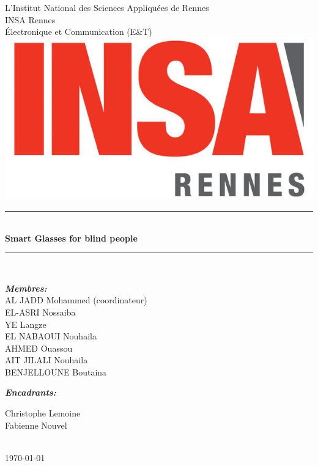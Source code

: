 \documentclass[12pt]{report}
\begin{document}

\begin{center}

\Huge{L’Institut National des Sciences Appliquées de Rennes}\\[.5cm]
\huge{INSA Rennes}\\[.5cm]

\Large
Électronique et Communication (E\&T)\\[1cm] 
\includegraphics[width=14cm, height=7cm]{4-Images/insa_logo.jpg}\\[0.5cm]

\sffamily
\noindent\rule{15cm}{2pt}\\[0.4cm]
\textbf{\Huge Smart Glasses for blind people}\\[0.2cm] 
\noindent\rule{15cm}{2pt}\\[1cm]
\large
\begin{minipage}[t]{.5\textwidth}
\begin{flushleft}
\emph{\textbf{\Large Membres:}}\\
AL JADD Mohammed (coordinateur)\\
EL-ASRI Nossaiba\\
YE Langze\\
EL NABAOUI Nouhaila\\
AHMED Ouassou \\
AIT JILALI Nouhaila\\
BENJELLOUNE Boutaina\\
\end{flushleft}

\end{minipage}\hfill\begin{minipage}[t]{.4\textwidth}

\begin{flushright}
\emph{\textbf{\Large Encadrants:}}

Christophe Lemoine\\
Fabienne Nouvel\\
\end{flushright}
\end{minipage}
\\[1cm]

{\today}\\[3cm]
\end{center}
\end{document}

